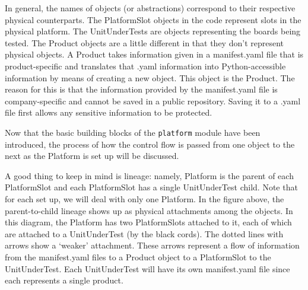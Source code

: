 \documentclass{report}
\begin{document}
In general, the names of objects (or abstractions) correspond to their respective physical counterparts. The PlatformSlot objects in the code represent slots in the physical platform. The UnitUnderTests are objects representing the boards being tested. The Product objects are a little different in that they don't represent physical objects. A Product takes information given in a manifest.yaml file that is product-specific and translates that .yaml information into Python-accessible information by means of creating a new object. This object is the Product. The reason for this is that the information provided by the manifest.yaml file is company-specific and cannot be saved in a public repository. Saving it to a .yaml file first allows any sensitive information to be protected.\\

	\begin{minipage}{\linewidth}
		\label{fig:platform}
	\end{minipage} 
	\vspace{5pt}		%

Now that the basic building blocks of the \texttt{platform} module have been introduced, the process of how the control flow is passed from one object to the next as the Platform is set up will be discussed.

A good thing to keep in mind is lineage: namely, Platform is the parent of each PlatformSlot and each PlatformSlot has a single UnitUnderTest child. Note that for each set up, we will deal with only one Platform. In the figure above, the parent-to-child lineage shows up as physical attachments among the objects. In this diagram, the Platform has two PlatformSlots attached to it, each of which are attached to a UnitUnderTest (by the black cords). The dotted lines with arrows show a `weaker' attachment. These arrows represent a flow of information from the manifest.yaml files to a Product object to a PlatformSlot to the UnitUnderTest. Each UnitUnderTest will have its own manifest.yaml file since each represents a single product. 
\end{document}
